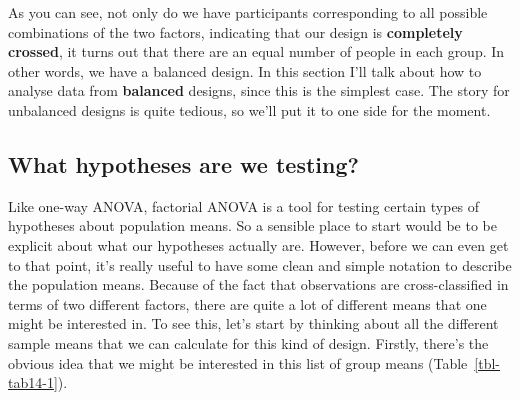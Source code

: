 \documentclass[
  a4paper,
]{book}
\begin{document}
As you can see, not only do we have participants corresponding to all
possible combinations of the two factors, indicating that our design is
\textbf{completely crossed}, it turns out that there are an equal number
of people in each group. In other words, we have a balanced design. In
this section I'll talk about how to analyse data from \textbf{balanced}
designs, since this is the simplest case. The story for unbalanced
designs is quite tedious, so we'll put it to one side for the moment.

\hypertarget{sec-What-hypotheses-are-we-testing}{%
\subsection{What hypotheses are we
testing?}\label{sec-What-hypotheses-are-we-testing}}

Like one-way ANOVA, factorial ANOVA is a tool for testing certain types
of hypotheses about population means. So a sensible place to start would
be to be explicit about what our hypotheses actually are. However,
before we can even get to that point, it's really useful to have some
clean and simple notation to describe the population means. Because of
the fact that observations are cross-classified in terms of two
different factors, there are quite a lot of different means that one
might be interested in. To see this, let's start by thinking about all
the different sample means that we can calculate for this kind of
design. Firstly, there's the obvious idea that we might be interested in
this list of group means (Table~\ref{tbl-tab14-1}).

\hypertarget{tbl-tab14-1}{}
 
  \providecommand{\huxb}[2]{\arrayrulecolor[RGB]{#1}\global\arrayrulewidth=#2pt}
  \providecommand{\huxvb}[2]{\color[RGB]{#1}\vrule width #2pt}
  \providecommand{\huxtpad}[1]{\rule{0pt}{#1}}
  \providecommand{\huxbpad}[1]{\rule[-#1]{0pt}{#1}}
\end{document}
